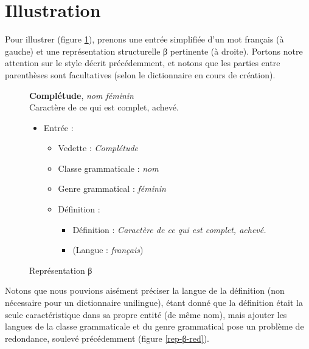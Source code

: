 \documentclass[10pt]{report}
\newcommand{\entité}[1]{\textcolor{blue!80!black}{#1}}
\newcommand{\caractéristique}[1]{\textcolor{green!60!black}{#1}}
\begin{document}
\section{Illustration}

Pour illustrer (figure \ref{rep-β}), prenons une entrée simplifiée d’un mot français (à gauche) et une représentation structurelle β pertinente (à droite). Portons notre attention sur le style décrit précédemment, et notons que les parties entre parenthèses sont facultatives (selon le dictionnaire en cours de création).

\begin{figure}[H]
	\centering
	\begin{minipage}{0.3\linewidth}
    \textbf{Complétude}, \textit{nom féminin}\\    
    Caractère de ce qui est complet, achevé.
	\end{minipage}%
	\begin{minipage}{0.5\linewidth}
    \begin{itemize}
    	\item \entité{Entrée} :
    	\begin{itemize}
        \item \caractéristique{Vedette} : \textit{Complétude}
        \item \caractéristique{Classe grammaticale} : \textit{nom}
        \item \caractéristique{Genre grammatical} : \textit{féminin}
        \item \entité{Définition} :
        \begin{itemize}
        	\item \caractéristique{Définition} : \textit{Caractère de ce qui est complet, achevé.}
        	\item (\caractéristique{Langue} : \textit{français})
        \end{itemize}
    	\end{itemize}
    \end{itemize}
	\end{minipage}
	\caption{Représentation β}
	\label{rep-β}
\end{figure}

Notons que nous pouvions aisément préciser la \caractéristique{langue} de la \caractéristique{définition} (non nécessaire pour un dictionnaire unilingue), étant donné que la \caractéristique{définition} était la seule caractéristique dans sa propre entité (de même nom), mais ajouter les \caractéristique{langues} de la \caractéristique{classe grammaticale} et du \caractéristique{genre grammatical} pose un problème de redondance, soulevé précédemment (figure \ref{rep-β-red}).
\end{document}
